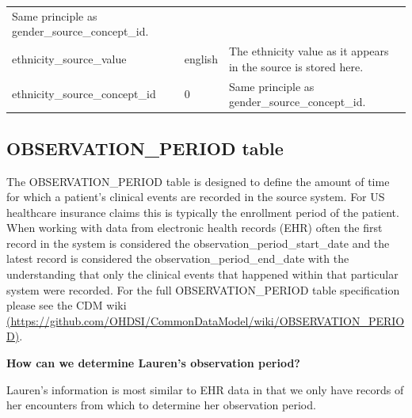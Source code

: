 \documentclass[]{book}
\begin{document}
\begin{longtable}[]{@{}lll@{}}
\begin{minipage}[t]{0.42\columnwidth}
Same principle as gender\_source\_concept\_id.\strut
\end{minipage}\tabularnewline
\begin{minipage}[t]{0.33\columnwidth}\raggedright\strut
ethnicity\_source\_value\strut
\end{minipage} & \begin{minipage}[t]{0.16\columnwidth}\raggedright\strut
english\strut
\end{minipage} & \begin{minipage}[t]{0.42\columnwidth}\raggedright\strut
The ethnicity value as it appears in the source is stored here.\strut
\end{minipage}\tabularnewline
\begin{minipage}[t]{0.33\columnwidth}\raggedright\strut
ethnicity\_source\_concept\_id\strut
\end{minipage} & \begin{minipage}[t]{0.16\columnwidth}\raggedright\strut
0\strut
\end{minipage} & \begin{minipage}[t]{0.42\columnwidth}\raggedright\strut
Same principle as gender\_source\_concept\_id.\strut
\end{minipage}\tabularnewline
\bottomrule
\end{longtable}

\subsection{OBSERVATION\_PERIOD table}\label{observationPeriod}

The OBSERVATION\_PERIOD table is designed to define the amount of time
for which a patient's clinical events are recorded in the source system.
For US healthcare insurance claims this is typically the enrollment
period of the patient. When working with data from electronic health
records (EHR) often the first record in the system is considered the
observation\_period\_start\_date and the latest record is considered the
observation\_period\_end\_date with the understanding that only the
clinical events that happened within that particular system were
recorded. For the full OBSERVATION\_PERIOD table specification please
see the CDM wiki
\href{https://github.com/OHDSI/CommonDataModel/wiki/OBSERVATION_PERIOD}{(https://github.com/OHDSI/CommonDataModel/wiki/OBSERVATION\_PERIOD)}.

\textbf{How can we determine Lauren's observation period?}

Lauren's information is most similar to EHR data in that we only have
records of her encounters from which to determine her observation
period.
\end{document}
